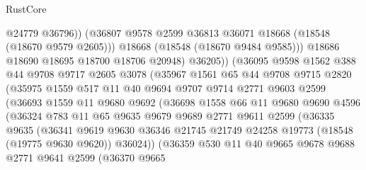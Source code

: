 \begin{lexlean}{RustCore}
\begin{coremodule}
                          @24779
                          @36796))
                      (@36807 @9578 @2599 @36813 @36071 @18668 (@18548 (@18670 @9579 @2605)))
                      @18668
                      (@18548 (@18670 @9484 @9585)))
                    @18686
                    @18690
                    @18695
                    @18700
                    @18706
                    @20948)
                  @36205))
              (@36095
                @9598
                @1562
                @388
                @44
                @9708
                @9717
                @2605
                @3078
                (@35967
                  @1561
                  @65
                  @44
                  @9708
                  @9715
                  @2820
                  (@35975
                    @1559
                    @517
                    @11
                    @40
                    @9694
                    @9707
                    @9714
                    @2771
                    @9603
                    @2599
                    (@36693
                      @1559
                      @11
                      @9680
                      @9692
                      (@36698
                        @1558
                        @66
                        @11
                        @9680
                        @9690
                        @4596
                        (@36324
                          @783
                          @11
                          @65
                          @9635
                          @9679
                          @9689
                          @2771
                          @9611
                          @2599
                          (@36335
                            @9635
                            (@36341
                              @9619
                              @9630
                              @36346
                              @21745
                              @21749
                              @24258
                              @19773
                              (@18548 (@19775 @9630 @9620))
                              @36024))
                          (@36359
                            @530
                            @11
                            @40
                            @9665
                            @9678
                            @9688
                            @2771
                            @9641
                            @2599
                            (@36370
                              @9665

\end{coremodule}
\end{lexlean}
